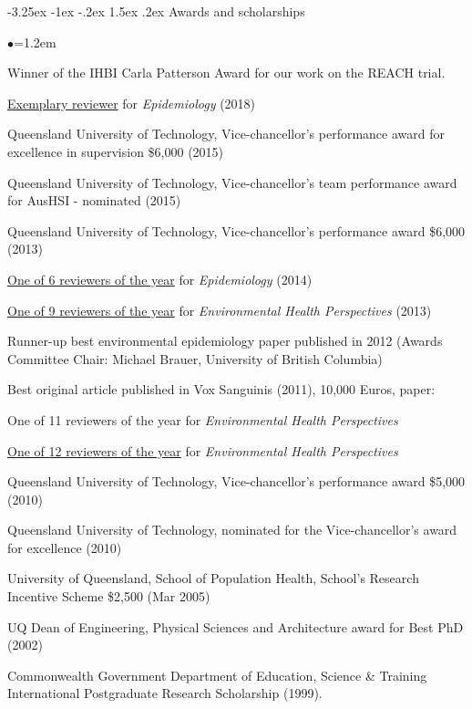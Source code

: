 \documentclass[a4paper,11pt]{article}
\makeatletter
\renewcommand\subsection{\@startsection{subsection}{2}{\z@}%
                                       {-3.25ex \@plus -1ex \@minus -.2ex}%
                                       {1.5ex \@plus .2ex}%
                                   {\normalfont\normalsize\bfseries\color{blue}}}
\renewcommand{\labelitemi}{$\bullet$}
\makeatother
\begin{document}
\begin{raggedright}
\subsection{Awards and scholarships}
\begin{list}{\labelitemi}{\leftmargin=1.2em}\addtolength{\itemsep}{-0.5\baselineskip}
\item Winner of the IHBI Carla Patterson Award for our work on the REACH trial.
\item \href{https://journals.lww.com/epidem/Fulltext/2018/03000/Thanks_to_Our_Reviewers.26.aspx/}{Exemplary reviewer} for \textit{Epidemiology} (2018)
\item Queensland University of Technology, Vice-chancellor's performance award for excellence in supervision \$6,000
(2015)
\item Queensland University of Technology, Vice-chancellor's team performance award for AusHSI - nominated
(2015)
\item Queensland University of Technology, Vice-chancellor's performance award \$6,000
(2013)
\item \href{http://journals.lww.com/epidem/Fulltext/2014/05000/Thanks_to_Our_Reviewers.1.aspx}{One of 6 reviewers of the year} for \textit{Epidemiology} (2014)
\item \href{http://ehp.niehs.nih.gov/122-A37/}{One of 9 reviewers of the year} for \textit{Environmental Health Perspectives} (2013)
\item Runner-up best environmental epidemiology paper published in 2012 (Awards Committee Chair: Michael Brauer, University of British Columbia)  %
\item Best original article published in Vox Sanguinis (2011), 10,000 Euros, paper: 
\item One of 11 reviewers of the year for \textit{Environmental Health Perspectives}
\item \href{http://ehp03.niehs.nih.gov/article/fetchArticle.action?articleURI=info%3Adoi%2F10.1289%2Fehp.119-a59}{One of 12 reviewers of the year} for \textit{Environmental Health Perspectives}
\item Queensland University of Technology, Vice-chancellor's performance award \$5,000
(2010)
\item Queensland University of Technology, nominated for the Vice-chancellor's award for excellence
(2010)
\item University of Queensland, School of Population Health, School's Research Incentive Scheme
\$2,500 (Mar 2005)
\item UQ Dean of Engineering, Physical Sciences and Architecture award for Best PhD (2002)
\item Commonwealth Government Department of Education, Science \& Training International
Postgraduate Research Scholarship (1999).
\end{list}


\end{raggedright}
\end{document}
